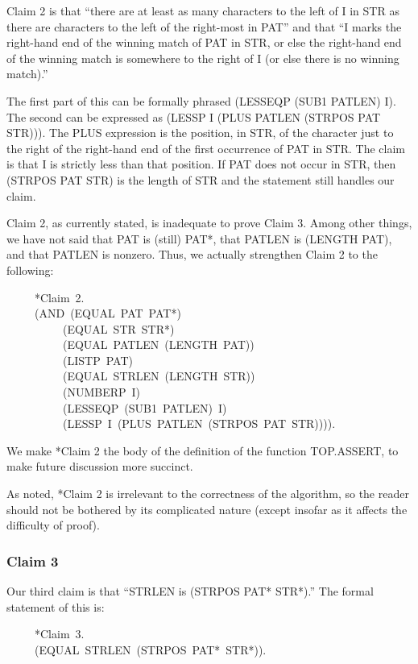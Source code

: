 \documentclass[11pt]{book}
\newenvironment{pubasis}{\begin{flushleft}\ttfamily\small}{\normalsize\rmfamily\end{flushleft}}
\newcommand{\pubdefaulttextsize}{\large}
\begin{document}
Claim 2 is that ``there are at least as many characters to the left
of I in STR as there are characters to the left of the right-most
in PAT'' and that ``I marks the right-hand
end of the winning match of PAT in STR, or else the right-hand end of
the winning match is somewhere to the right of I (or else there is no winning
match).''

The first part of this can be formally phrased (LESSEQP (SUB1 PATLEN) I).
The second can be expressed as (LESSP I (PLUS PATLEN (STRPOS PAT STR))).  The PLUS expression is
the position, in STR, of the character just to the right of the right-hand end of the first
occurrence of PAT in STR.  The claim is that I is strictly less than
that position.  If PAT does not occur in STR, then (STRPOS PAT STR) is
the length of STR and the statement still handles our claim.

Claim 2, as currently stated, is inadequate to prove Claim 3.
Among other things, we have not said that PAT is (still) PAT*, that PATLEN is (LENGTH PAT),
and that PATLEN is nonzero.
Thus, we actually strengthen Claim 2 to the following:
\begin{pubasis}
~~~~~*Claim~2.\\
~~~~~(AND~(EQUAL~PAT~PAT*)\\
~~~~~~~~~~(EQUAL~STR~STR*)\\
~~~~~~~~~~(EQUAL~PATLEN~(LENGTH~PAT))\\
~~~~~~~~~~(LISTP~PAT)\\
~~~~~~~~~~(EQUAL~STRLEN~(LENGTH~STR))\\
~~~~~~~~~~(NUMBERP~I)\\
~~~~~~~~~~(LESSEQP~(SUB1~PATLEN)~I)\\
~~~~~~~~~~(LESSP~I~(PLUS~PATLEN~(STRPOS~PAT~STR)))).\\
\end{pubasis}
We  make *Claim 2 the body of the definition of the function
TOP.ASSERT,  to make future discussion more succinct.

As noted, *Claim 2 is irrelevant to the correctness of the
algorithm, so the reader should not be bothered by its complicated
nature (except insofar as it affects the difficulty of proof).
\subsubsection{Claim 3}
\pubdefaulttextsize
Our third claim is that ``STRLEN is (STRPOS PAT* STR*).''  The formal
statement of this is:
\begin{pubasis}
~~~~~*Claim~3.\\
~~~~~(EQUAL~STRLEN~(STRPOS~PAT*~STR*)).\\
\end{pubasis}
\end{document}
